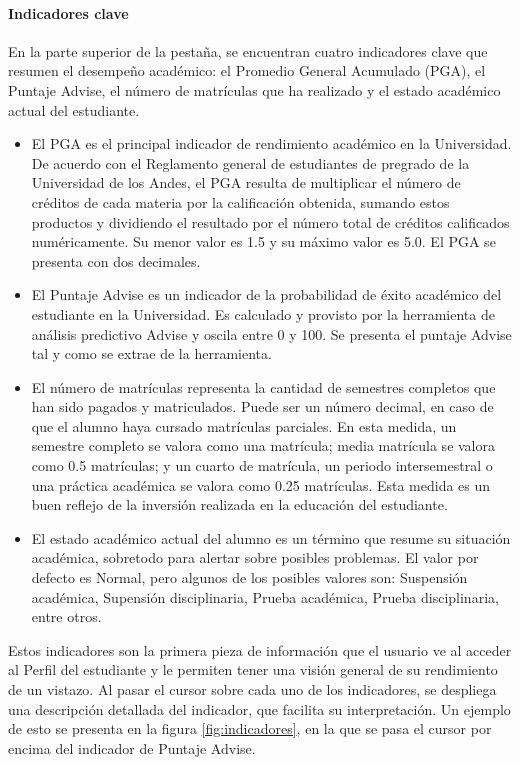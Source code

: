 \paragraph{Indicadores clave} En la parte superior de la pestaña, se encuentran cuatro indicadores clave que resumen el desempeño académico: el Promedio General Acumulado (PGA), el Puntaje Advise, el número de matrículas que ha realizado y el estado académico actual del estudiante.
\begin{itemize}
	\item El PGA es el principal indicador de rendimiento académico en la Universidad. De acuerdo con el Reglamento general de estudiantes de pregrado de la Universidad de los Andes, el PGA resulta de multiplicar el número de créditos de cada materia por la calificación obtenida, sumando estos productos y dividiendo el resultado por el número total de créditos calificados numéricamente.
	      Su menor valor es 1.5 y su máximo valor es 5.0. El PGA se presenta con dos decimales.
	\item El Puntaje Advise es un indicador de la probabilidad de éxito académico del estudiante en la Universidad. Es calculado y provisto por la herramienta de análisis predictivo Advise y oscila entre 0 y 100. Se presenta el puntaje Advise tal y como se extrae de la herramienta.
	\item El número de matrículas representa la cantidad de semestres completos que han sido pagados y matriculados. Puede ser un número decimal, en caso de que el alumno haya cursado matrículas parciales. En esta medida, un semestre completo se valora como una matrícula; media matrícula se valora como 0.5 matrículas; y un cuarto de matrícula, un periodo intersemestral o una práctica académica se valora como 0.25 matrículas. Esta medida es un buen reflejo de la inversión realizada en la educación del estudiante.
	\item El estado académico actual del alumno es un término que resume su situación académica, sobretodo para alertar sobre posibles problemas. El valor por defecto es Normal, pero algunos de los posibles valores son: Suspensión académica, Supensión disciplinaria, Prueba académica, Prueba disciplinaria, entre otros.
\end{itemize}

Estos indicadores son la primera pieza de información que el usuario ve al acceder al Perfil del estudiante y le permiten tener una visión general de su rendimiento de un vistazo. Al pasar el cursor sobre cada uno de los indicadores, se despliega una descripción detallada del indicador, que facilita su interpretación. Un ejemplo de esto se presenta en la figura \ref{fig:indicadores}, en la que se pasa el cursor por encima del indicador de Puntaje Advise.

